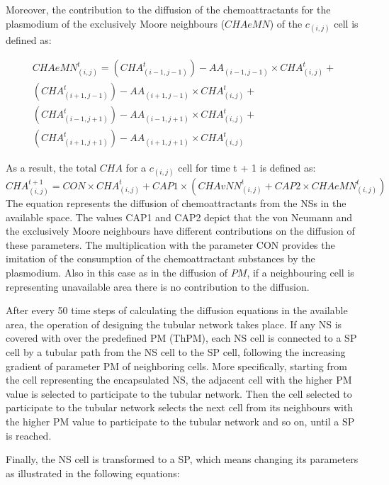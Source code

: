 Moreover, the contribution to the diffusion of the chemoattractants for the plasmodium of the exclusively Moore neighbours ($CHAeMN$) of the $c_{(i,j)}$ cell is defined as:

\begin{equation}
\begin{split}
CHAeMN^t_{(i, j)} = 
(CHA^t_{(i-1, j-1)}) - AA_{(i-1, j-1)} \times CHA^t_{(i, j)} +
\\(CHA^t_{(i+1, j-1)}) - AA_{(i+1, j-1)} \times CHA^t_{(i, j)} +
\\(CHA^t_{(i-1, j+1)}) - AA_{(i-1, j+1)} \times CHA^t_{(i, j)}  +
\\(CHA^t_{(i+1, j+1)}) - AA_{(i+1, j+1)} \times CHA^t_{(i, j)}
\end{split}
\end{equation}

As a result, the total $CHA$ for a $c_{(i,j)}$ cell for time t + 1 is defined as:
\begin{equation}
CHA^{t+1}_{(i, j)} = CON \times {CHA^t_{(i, j)} + CAP1 \times (CHAvNN^t_{(i, j)} + CAP2 \times CHAeMN^t_{(i, j)})}
\end{equation}
The equation represents the diffusion of chemoattractants from the NSs in the available space. The values CAP1 and CAP2 depict that the von Neumann and the exclusively Moore neighbours have different contributions on the diffusion of these parameters. The multiplication with the parameter CON provides the imitation of the consumption of the chemoattractant substances by the plasmodium. Also in this case as in the diffusion of $PM$, if a neighbouring cell is representing unavailable area there is no contribution to the diffusion.

\par
After every 50 time steps of calculating the diffusion equations in the available area, the operation of designing the tubular network takes place. If any NS is covered with over the predefined PM (ThPM), each NS cell is connected to a SP cell by a tubular path from the NS cell to the SP cell, following the increasing gradient of parameter PM of neighboring cells. 
More specifically, starting from the cell representing the encapsulated NS, the adjacent cell with the higher PM value is selected to participate to the tubular network. Then the cell selected to participate to the tubular network selects the next cell from its neighbours with the higher PM value to participate to the tubular network and so on, until a SP is reached.

\par
Finally, the NS cell is transformed to a SP, which means changing its parameters as illustrated in the following equations:

